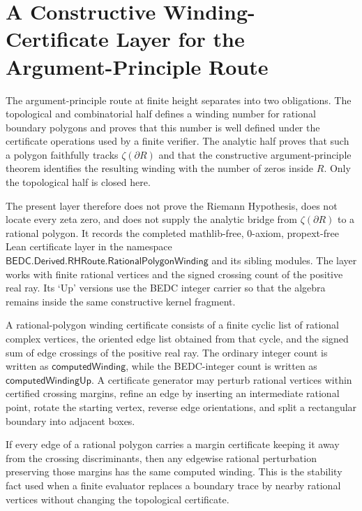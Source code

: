 \providecommand{\ConstructiveWindingCertificateUp}{\mathsf{ConstructiveWindingCertificate}^{\uparrow}}

\chapter{A Constructive Winding-Certificate Layer for the Argument-Principle Route}
\label{ch:visions-rh-constructive-winding-certificate-layer}

The argument-principle route at finite height separates into two obligations.
The topological and combinatorial half defines a winding number for rational
boundary polygons and proves that this number is well defined under the
certificate operations used by a finite verifier. The analytic half proves
that such a polygon faithfully tracks $\zeta(\partial R)$ and that the
constructive argument-principle theorem identifies the resulting winding with
the number of zeros inside $R$. Only the topological half is closed here.

The present layer therefore does not prove the Riemann Hypothesis, does not
locate every zeta zero, and does not supply the analytic bridge from
$\zeta(\partial R)$ to a rational polygon. It records the completed
mathlib-free, 0-axiom, propext-free Lean certificate layer in the namespace
$\mathsf{BEDC.Derived.RHRoute.RationalPolygonWinding}$ and its sibling
modules. The layer works with finite rational vertices and the signed crossing
count of the positive real ray. Its `Up' versions use the BEDC integer carrier
so that the algebra remains inside the same constructive kernel fragment.

\begin{definition}
\label{def:rh-rational-polygon-winding-certificate-layer}
A rational-polygon winding certificate consists of a finite cyclic list of
rational complex vertices, the oriented edge list obtained from that cycle,
and the signed sum of edge crossings of the positive real ray. The ordinary
integer count is written as $\mathsf{computedWinding}$, while the BEDC-integer
count is written as $\mathsf{computedWindingUp}$. A certificate generator may
perturb rational vertices within certified crossing margins, refine an edge by
inserting an intermediate rational point, rotate the starting vertex, reverse
edge orientations, and split a rectangular boundary into adjacent boxes.
\end{definition}

\begin{principle}
\label{prin:rh-winding-perturbation-stability}
If every edge of a rational polygon carries a margin certificate keeping it
away from the crossing discriminants, then any edgewise rational perturbation
preserving those margins has the same computed winding. This is the stability
fact used when a finite evaluator replaces a boundary trace by nearby rational
vertices without changing the topological certificate.
\end{principle}

